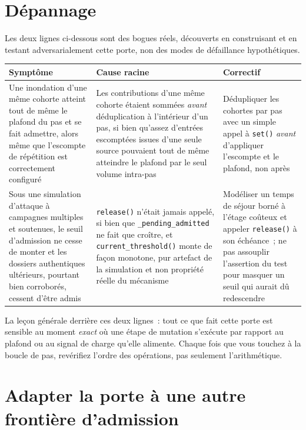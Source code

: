 \documentclass[11pt]{article}
\begin{document}
\section{Dépannage}
\label{sec:pieges}

Les deux lignes ci-dessous sont des bogues réels, découverts en
construisant et en testant adversarialement cette porte, non des modes de
défaillance hypothétiques.

\begin{center}\small
\begin{tabular}{>{\raggedright\arraybackslash}p{4.3cm}>{\raggedright\arraybackslash}p{4.3cm}>{\raggedright\arraybackslash}p{4.9cm}}
\toprule
Symptôme & Cause racine & Correctif \\
\midrule
Une inondation d'une même cohorte atteint tout de même le plafond du pas
et se fait admettre, alors même que l'escompte de répétition est
correctement configuré &
Les contributions d'une même cohorte étaient sommées \emph{avant}
déduplication à l'intérieur d'un pas, si bien qu'assez d'entrées
escomptées issues d'une seule source pouvaient tout de même atteindre le
plafond par le seul volume intra-pas &
Dédupliquer les cohortes par pas avec un simple appel à \texttt{set()}
\emph{avant} d'appliquer l'escompte et le plafond, non après \\
\addlinespace
Sous une simulation d'attaque à campagnes multiples et soutenues, le
seuil d'admission ne cesse de monter et les dossiers authentiques
ultérieurs, pourtant bien corroborés, cessent d'être admis &
\texttt{release()} n'était jamais appelé, si bien que
\texttt{\_pending\_admitted} ne fait que croître, et
\texttt{current\_threshold()} monte de façon monotone, pur artefact de
la simulation et non propriété réelle du mécanisme &
Modéliser un temps de séjour borné à l'étage coûteux et appeler
\texttt{release()} à son échéance~; ne pas assouplir l'assertion du test
pour masquer un seuil qui aurait dû redescendre \\
\bottomrule
\end{tabular}
\end{center}

La leçon générale derrière ces deux lignes~: tout ce que fait cette porte
est sensible au moment \emph{exact} où une étape de mutation s'exécute
par rapport au plafond ou au signal de charge qu'elle alimente. Chaque
fois que vous touchez à la boucle de pas, revérifiez l'ordre des
opérations, pas seulement l'arithmétique.

\section{Adapter la porte à une autre frontière d'admission}
\label{sec:adapt}
\end{document}
